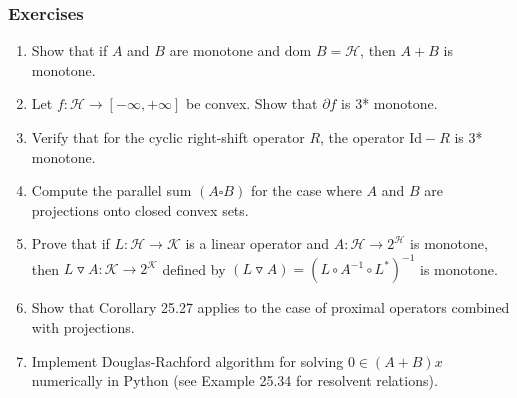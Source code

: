 \documentclass[aspectratio=169,10pt]{beamer}
\begin{document}
\begin{frame}[allowframebreaks]
  \frametitle{Exercises}

  \begin{enumerate}
    \item Show that if $A$ and $B$ are monotone and $\text{dom } B = \mathcal{H}$, then $A + B$ is monotone.

    \vspace{0.2cm}

    \item Let $f: \mathcal{H} \to [-\infty, +\infty]$ be convex. Show that $\partial f$ is 3* monotone.

    \vspace{0.2cm}

    \item Verify that for the cyclic right-shift operator $R$, the operator $\text{Id} - R$ is 3* monotone.

    \vspace{0.2cm}

    \item Compute the parallel sum $(A \square B)$ for the case where $A$ and $B$ are projections onto closed convex sets.

    \vspace{0.2cm}

    \item Prove that if $L: \mathcal{H} \to \mathcal{K}$ is a linear operator and $A: \mathcal{H} \to 2^{\mathcal{H}}$ is monotone,
      then $L \triangledown A: \mathcal{K} \to 2^{\mathcal{K}}$ defined by $(L \triangledown A) = (L \circ A^{-1} \circ L^*)^{-1}$ is monotone.

    \vspace{0.2cm}

    \item Show that Corollary 25.27 applies to the case of proximal operators combined with projections.

    \vspace{0.2cm}

    \item Implement Douglas-Rachford algorithm for solving $0 \in (A + B)x$ numerically in Python
      (see Example 25.34 for resolvent relations).

  \end{enumerate}

\end{frame}
\end{document}
